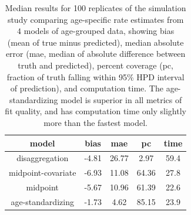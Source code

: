 \begin{table}

\begin{center}
\begin{tabular}{|c|c|c|c|c|}
\hline
model&bias&mae&pc&time\\
\hline
disaggregation&-4.81&26.77&2.97&59.4\\
midpoint-covariate&-6.93&11.08&64.36&27.8\\
midpoint&-5.67&10.96&61.39&22.6\\
age-standardizing&-1.73&4.62&85.15&23.9\\
\hline
\end{tabular}
\end{center}

\caption{Median results for 100 replicates of the simulation study
  comparing age-specific rate estimates from $4$ models of age-grouped
  data, showing bias (mean of true minus predicted), median absolute
  error (mae, median of absolute difference between truth and
  predicted), percent coverage (pc, fraction of truth falling within
  95\% HPD interval of prediction), and computation time. The
  age-standardizing model is superior in all metrics of fit quality,
  and has computation time only slightly more than the fastest model.}
\label{age_group_comparison}
\end{table}
